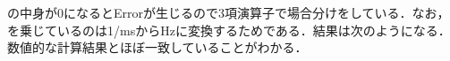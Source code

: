 の中身が0になるとErrorが生じるので3項演算子で場合分けをしている．なお，を乗じているのは1/msからHzに変換するためである．結果は次のようになる．数値的な計算結果とほぼ一致していることがわかる．
